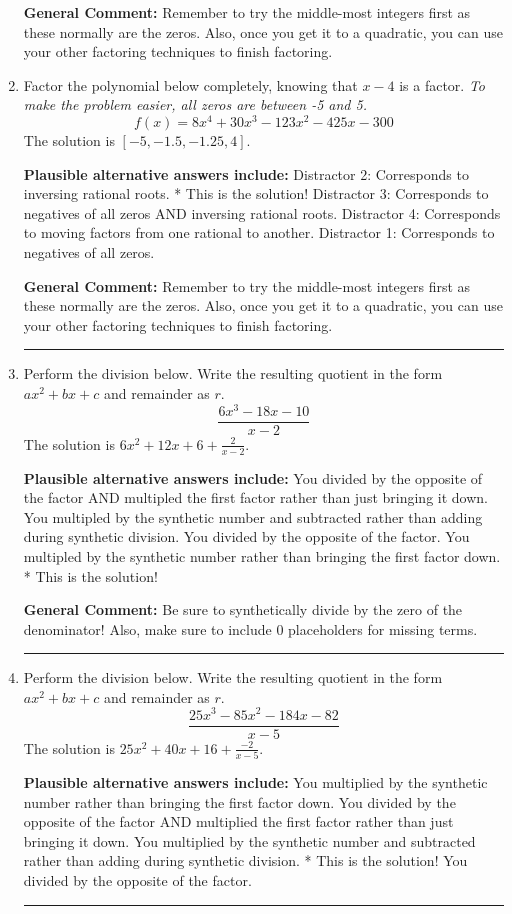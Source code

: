 \documentclass{extbook}[14pt]
\newcommand{\litem}[1]{\item #1

\rule{\textwidth}{0.4pt}}
\begin{document}
\begin{enumerate}
{\textbf{General Comment:} Remember to try the middle-most integers first as these normally are the zeros. Also, once you get it to a quadratic, you can use your other factoring techniques to finish factoring.
}
\litem{
Factor the polynomial below completely, knowing that $x -4$ is a factor. \textit{To make the problem easier, all zeros are between -5 and 5.}
\[ f(x) = 8x^{4} +30 x^{3} -123 x^{2} -425 x -300 \]The solution is \( [-5, -1.5, -1.25, 4] \).\begin{enumerate}[label=\Alph*.]
\textbf{Plausible alternative answers include:} Distractor 2: Corresponds to inversing rational roots.
* This is the solution!
 Distractor 3: Corresponds to negatives of all zeros AND inversing rational roots.
 Distractor 4: Corresponds to moving factors from one rational to another.
 Distractor 1: Corresponds to negatives of all zeros.
\end{enumerate}

\textbf{General Comment:} Remember to try the middle-most integers first as these normally are the zeros. Also, once you get it to a quadratic, you can use your other factoring techniques to finish factoring.
}
\litem{
Perform the division below. Write the resulting quotient in the form $ax^2+bx+c$ and remainder as $r$.
\[ \frac{6x^{3} -18 x -10}{x -2} \]The solution is \( 6x^{2} +12 x + 6 + \frac{2}{x -2} \).\begin{enumerate}[label=\Alph*.]
\textbf{Plausible alternative answers include:} You divided by the opposite of the factor AND multipled the first factor rather than just bringing it down.
 You multipled by the synthetic number and subtracted rather than adding during synthetic division.
 You divided by the opposite of the factor.
 You multipled by the synthetic number rather than bringing the first factor down.
* This is the solution!
\end{enumerate}

\textbf{General Comment:} Be sure to synthetically divide by the zero of the denominator! Also, make sure to include 0 placeholders for missing terms.
}
\litem{
Perform the division below. Write the resulting quotient in the form $ax^2+bx+c$ and remainder as $r$.
\[ \frac{25x^{3} -85 x^{2} -184 x -82}{x -5} \]The solution is \( 25x^{2} +40 x + 16 + \frac{-2}{x -5} \).\begin{enumerate}[label=\Alph*.]
\textbf{Plausible alternative answers include:} You multiplied by the synthetic number rather than bringing the first factor down.
 You divided by the opposite of the factor AND multiplied the first factor rather than just bringing it down.
 You multiplied by the synthetic number and subtracted rather than adding during synthetic division.
* This is the solution!
 You divided by the opposite of the factor.
\end{enumerate}

}
\end{enumerate}
\end{document}
